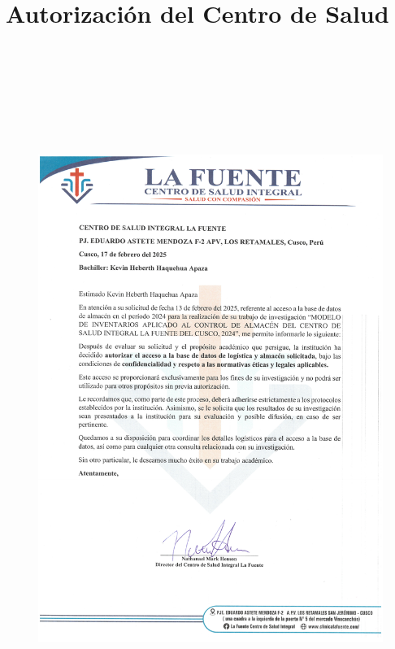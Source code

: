 \section{Autorización del Centro de Salud}
\begin{figure}[H]
  {\includegraphics[width=17cm, height=23cm]{images/AUTORIZACION.pdf}}
\end{figure}

